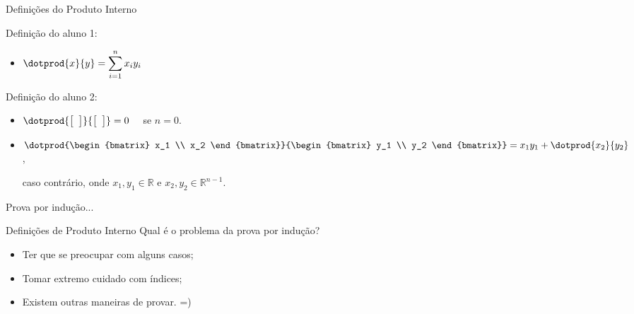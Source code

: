 \begin{frame}{Definições do Produto Interno}
  \vfill
  \begin{minipage}[t]{0.45\textwidth}
    Definição do aluno 1:
    \vspace{0.5cm}
    \begin{itemize}
      \item $\dotprod{x}{y} = \displaystyle\sum_{i=1}^{n} x_i y_i$
    \end{itemize}
  \end{minipage}
  \hfill
  \vrule
  \hfill
  \begin{minipage}[t]{0.50\textwidth}
    Definição do aluno 2:
    \vspace{0.5cm}
    \begin{itemize}
      \item $\dotprod{\begin{bmatrix} \hphantom{a} \end{bmatrix}}{\begin{bmatrix} \hphantom{a} \end{bmatrix}} = 0 \quad$ se $n = 0$.
      \vspace{0.5cm}
      \item $\dotprod{\begin{bmatrix} x_1 \\ x_2 \end{bmatrix}}{\begin{bmatrix} y_1 \\ y_2 \end{bmatrix}} = x_1 y_1 + \dotprod{x_2}{y_2}$,

      \vspace{0.3cm}
      caso contrário, onde $x_1, y_1 \in \mathbb{R}$ e $x_2, y_2 \in \mathbb{R}^{n-1}$.
    \end{itemize}
  \end{minipage}
  \vfill \pause
  \begin{center}
    Prova por indução...
  \end{center}
\end{frame}

\begin{frame}{Definições de Produto Interno}
  Qual é o problema da prova por indução?
  \pause
  \vspace{1cm}
  \begin{itemize}
    \item Ter que se preocupar com alguns casos; \pause \\[0.3cm]
    \item Tomar extremo cuidado com índices; \pause \\[0.3cm]
    \item Existem outras maneiras de provar. =)
  \end{itemize}
\end{frame}
